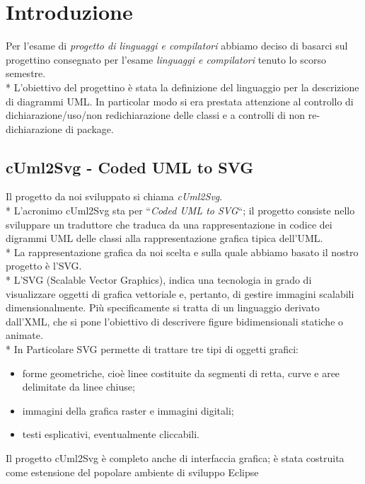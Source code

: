 \chapter{Introduzione}

Per l'esame di \emph{progetto di linguaggi e compilatori} abbiamo deciso di
basarci sul progettino consegnato per l'esame \emph{linguaggi e compilatori}
tenuto lo scorso semestre. \\*
L'obiettivo del progettino è stata la definizione del linguaggio per la 
descrizione di diagrammi UML. In particolar modo si era prestata attenzione al
controllo di dichiarazione/uso/non redichiarazione
delle classi e a controlli di non re-dichiarazione di package.




\section{cUml2Svg - Coded UML to SVG} 
Il progetto da noi sviluppato si chiama \emph{cUml2Svg}. \\*
L'acronimo cUml2Svg sta per ``\emph{Coded UML to SVG}``; 
il progetto consiste nello sviluppare un traduttore che traduca da una
rappresentazione in codice dei digrammi UML delle classi alla rappresentazione
grafica tipica dell'UML.\\*
La rappresentazione grafica da noi scelta e sulla quale abbiamo basato il nostro
progetto è l'SVG.\\*
L'SVG (Scalable Vector Graphics), indica una tecnologia in grado di visualizzare oggetti 
di grafica vettoriale e, pertanto, di gestire immagini scalabili dimensionalmente.
Più specificamente si tratta di un linguaggio derivato dall'XML, che si pone l'obiettivo 
di descrivere figure bidimensionali statiche o animate. \\*
In Particolare SVG permette di trattare tre tipi di oggetti grafici:

\begin{itemize}
  \item forme geometriche, cioè linee costituite da segmenti di retta, curve e
  aree delimitate da linee chiuse;
  \item immagini della grafica raster e immagini digitali;
  \item testi esplicativi, eventualmente cliccabili.
\end{itemize} 


Il progetto cUml2Svg è completo anche di interfaccia grafica; è stata costruita
come estensione del popolare ambiente di sviluppo Eclipse~\cite{eclipse_website:1}

